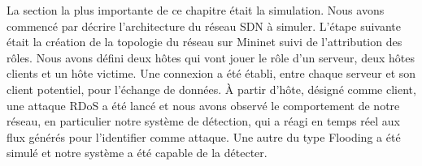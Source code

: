 La section la plus importante de ce chapitre était la simulation. Nous avons commencé par décrire l'architecture du réseau SDN à simuler. L'étape suivante était la création de la topologie du réseau sur Mininet suivi de l'attribution des rôles. Nous avons défini deux hôtes qui vont jouer le rôle d'un serveur, deux hôtes clients et un hôte victime. Une connexion a été établi, entre chaque serveur et son client potentiel, pour l'échange de données. À partir d'hôte, désigné comme client, une attaque RDoS a été lancé et nous avons observé le comportement de notre réseau, en particulier notre système de détection, qui a réagi en temps réel aux flux générés pour l'identifier comme attaque. Une autre du type Flooding a été simulé et notre système a été capable de la détecter.\\




 


